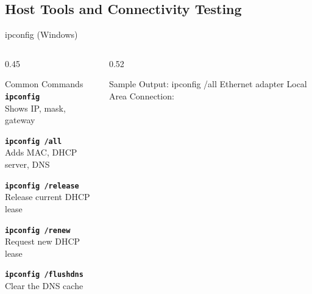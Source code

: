 \documentclass[aspectratio=169]{beamer}  %
\begin{document}
\subsection{Host Tools and Connectivity Testing}


\begin{frame}{ipconfig (Windows)}
    \begin{columns}[T]
        \begin{column}{0.45\textwidth}
            \begin{block}{Common Commands}
                \small
                \texttt{\textbf{ipconfig}} \\
                Shows IP, mask, gateway
                
                \vspace{0.3em}
                \texttt{\textbf{ipconfig /all}} \\
                Adds MAC, DHCP server, DNS
                
                \vspace{0.3em}
                \texttt{\textbf{ipconfig /release}} \\
                Release current DHCP lease
                
                \vspace{0.3em}
                \texttt{\textbf{ipconfig /renew}} \\
                Request new DHCP lease
                
                \vspace{0.3em}
                \texttt{\textbf{ipconfig /flushdns}} \\
                Clear the DNS cache
            \end{block}
        \end{column}
        \begin{column}{0.52\textwidth}
            \begin{block}{Sample Output: ipconfig /all}
                \ttfamily\tiny
                Ethernet adapter Local Area Connection:
                

\end{block}
\end{column}
\end{columns}
\end{frame}
\end{document}
